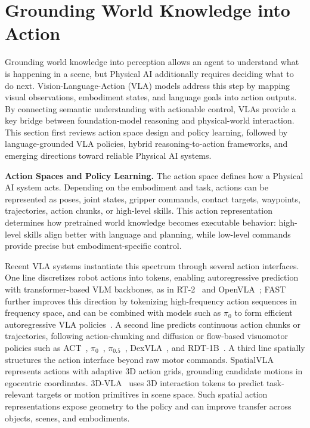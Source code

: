 \section{Grounding World Knowledge into Action}
\label{sec:vla_action}

Grounding world knowledge into perception allows an agent to understand what is happening in a scene, but Physical AI additionally requires deciding what to do next. Vision-Language-Action (VLA) models address this step by mapping visual observations, embodiment states, and language goals into action outputs. By connecting semantic understanding with actionable control, VLAs provide a key bridge between foundation-model reasoning and physical-world interaction. This section first reviews action space design and policy learning, followed by language-grounded VLA policies, hybrid reasoning-to-action frameworks, and emerging directions toward reliable Physical AI systems.

\noindent\textbf{Action Spaces and Policy Learning.}
The action space defines how a Physical AI system acts. Depending on the embodiment and task, actions can be represented as poses, joint states, gripper commands, contact targets, waypoints, trajectories, action chunks, or high-level skills. 
This action representation determines how pretrained world knowledge becomes executable behavior: high-level skills align better with language and planning, while low-level commands provide precise but embodiment-specific control.

Recent VLA systems instantiate this spectrum through several action interfaces.
One line discretizes robot actions into tokens, enabling autoregressive prediction with transformer-based VLM backbones, as in RT-2~\cite{zitkovich2023rt} and OpenVLA~\cite{kim2024openvla}; FAST further improves this direction by tokenizing high-frequency action sequences in frequency space, and can be combined with models such as $\pi_0$ to form efficient autoregressive VLA policies~\cite{pertsch2025fast}.
A second line predicts continuous action chunks or trajectories, following action-chunking and diffusion or flow-based visuomotor policies such as ACT~\cite{act}, $\pi_0$~\cite{black2024pi0}, $\pi_{0.5}$~\cite{physicalintelligence2025pi05}, DexVLA~\cite{wen2025dexvla}, and RDT-1B~\cite{rdt1b2025}.
A third line spatially structures the action interface beyond raw motor commands.
SpatialVLA~\cite{qu2025spatialvla} represents actions with adaptive 3D action grids, grounding candidate motions in egocentric coordinates.
3D-VLA~\cite{zhen2024threedvla} uses 3D interaction tokens to predict task-relevant targets or motion primitives in scene space.
Such spatial action representations expose geometry to the policy and can improve transfer across objects, scenes, and embodiments.


